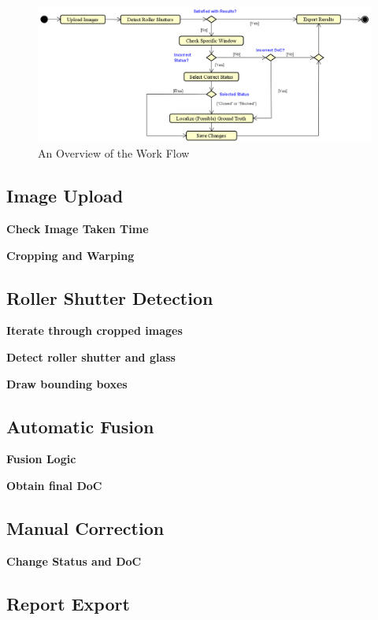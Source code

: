\begin{figure}[h]
  \centering
  \includegraphics[width=1\textwidth]{Figures/Activity Diagram.png}
  \caption{An Overview of the Work Flow}
  \label{fig:16}  
\end{figure}

\subsection{Image Upload}


\textbf{Check Image Taken Time}

\textbf{Cropping and Warping}

\subsection{Roller Shutter Detection}

\textbf{Iterate through cropped images}

\textbf{Detect roller shutter and glass}

\textbf{Draw bounding boxes}

\subsection{Automatic Fusion}



\textbf{Fusion Logic}

\textbf{Obtain final DoC}

\subsection{Manual Correction}

\textbf{Change Status and DoC}

\subsection{Report Export}



